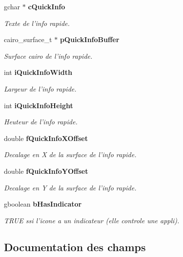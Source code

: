 \begin{CompactItemize}
gchar $\ast$ {\bf cQuickInfo}
\begin{CompactList}\small\item\em Texte de l'info rapide. \item\end{CompactList}\item 
cairo\_\-surface\_\-t $\ast$ {\bf pQuickInfoBuffer}
\begin{CompactList}\small\item\em Surface cairo de l'info rapide. \item\end{CompactList}\item 
int {\bf iQuickInfoWidth}
\begin{CompactList}\small\item\em Largeur de l'info rapide. \item\end{CompactList}\item 
int {\bf iQuickInfoHeight}
\begin{CompactList}\small\item\em Heuteur de l'info rapide. \item\end{CompactList}\item 
double {\bf fQuickInfoXOffset}
\begin{CompactList}\small\item\em Decalage en X de la surface de l'info rapide. \item\end{CompactList}\item 
double {\bf fQuickInfoYOffset}
\begin{CompactList}\small\item\em Decalage en Y de la surface de l'info rapide. \item\end{CompactList}\item 
gboolean {\bf bHasIndicator}
\begin{CompactList}\small\item\em TRUE ssi l'icone a un indicateur (elle controle une appli). \item\end{CompactList}\end{CompactItemize}


\subsection{Documentation des champs}
